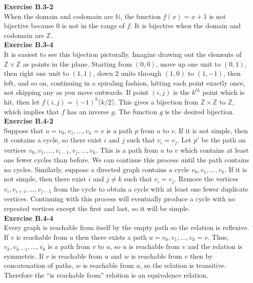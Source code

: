 \documentclass{article}
\begin{document}
\noindent\textbf{Exercise B.3-2}\\

When the domain and codomain are $\mathbb{N}$, the function $f(x) = x+1$ is not bijective because 0 is not in the range of $f$.  It is bijective when the domain and codomain are $\mathbb{Z}$. \\

\noindent\textbf{Exercise B.3-4}\\

It is easiest to see this bijection pictorally.  Imagine drawing out the elements of $\mathbb{Z} \times \mathbb{Z}$ as points in the plane.  Starting from $(0,0)$, move up one unit to $(0,1)$, then right one unit to $(1,1)$, down 2 units through $(1,0)$ to $(1,-1)$, then left, and so on, continuing in a spiraling fashion, hitting each point exactly once, not skipping any as you move outwards.  If point $(i,j)$ is the $k^{th}$ point which is hit, then let $f(i,j) = (-1)^k\lceil k/2 \rceil$.  This gives a bijection from $\mathbb{Z} \times \mathbb{Z}$ to $\mathbb{Z}$, which implies that $f$ has an inverse $g$.  The function $g$ is the desired bijection. \\

\noindent\textbf{Exercise B.4-2}\\

Suppose that $u = v_0, v_1, \ldots, v_k = v$ is a path $p$ from $u$ to $v$.  If it is not simple, then it contains a cycle, so there exist $i$ and $j$ such that $v_i = v_j$.  Let $p'$ be the path on vertices $v_0, v_1, \ldots, v_{i-1}, v_j, \ldots, v_k$.  This is a path from $u$ to $v$ which contains at least one fewer cycles than before.  We can continue this process until the path contains no cycles. Similarly, suppose a directed graph contains a cycle $v_0, v_1, \ldots, v_k$.  If it is not simple, then there exist $i$ and $j \neq k$ such that $v_i = v_j$.  Remove the vertices $v_i, v_{i+1}, \ldots, v_{j-1}$ from the cycle to obtain a cycle with at least one fewer duplicate vertices.  Continuing with this process will eventually produce a cycle with no repeated vertices except the first and last, so it will be simple. \\


\noindent\textbf{Exercise B.4-4}\\

Every graph is reachable from itself by the empty path so the relation is reflexive.  If $v$ is reachable from $u$ then there exists a path $u = v_0, v_1, \ldots, v_k = v$.  Thus, $v_k, v_{k-1}, \ldots, v_0$ is a path from $v$ to $u$, so $u$ is reachable from $v$ and the relation is symmetric.  If $v$ is reachable from $u$ and $w$ is reachable from $v$ then by concatenation of paths, $w$ is reachable from $u$, so the relation is transitive.  Therefore the ``is reachable from'' relation is an equivalence relation. \\
\end{document}
